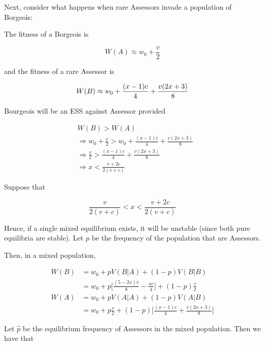 \documentclass{article}
\begin{document}
Next, consider what happens when rare Assessors invade a population of Borgeois:

The fitness of a Borgeois is

\begin{equation*}
    W(A) \approx w_0 + \frac{v}{2}
\end{equation*}

and the fitness of a rare Assessor is

\begin{equation*}
    W(B) \approx w_0 + \frac{(x - 1) c}{4} + \frac{v (2 x + 3)}{8} \\
\end{equation*}

Bourgeois will be an ESS against Assessor provided

\begin{align*}
    &W(B) > W(A) \\
    &\Rightarrow w_0 + \frac{v}{2} > w_0 + \frac{(x - 1) c}{4} + \frac{v (2 x + 3)}{8} \\
    &\Rightarrow \frac{v}{2} > \frac{(x - 1) c}{4} + \frac{v (2 x + 3)}{8} \\
    &\Rightarrow x < \frac{v + 2 c}{2(v + c)}
\end{align*}

Suppose that

\begin{equation*}
    \frac{v}{2(v + c)} < x < \frac{v + 2 c}{2(v + c)}
\end{equation*}

Hence, if a single mixed equilibrium exists, it will be unstable (since
both pure equilibria are stable). Let $p$ be the frequency of the
population that are Assessors.

Then, in a mixed population,

\begin{align*}
    W(B) &= w_0 + p V(B|A) + (1 - p) V(B|B) \\
         &= w_0 + p \Big[\frac{(5 - 2 x) v}{8} - \frac{x c}{4}\Big]
            + (1 - p) \frac{v}{2} \\
    W(A) &= w_0 + p V(A|A) + (1 - p) V(A|B) \\
         &= w_0 + p \frac{v}{2}
            + (1 - p) \Big[\frac{(x - 1) c}{4} + \frac{v (2 x + 3)}{8}\Big]
\end{align*}

Let $\hat{p}$ be the equilibrium frequency of Assessors in the mixed
population. Then we have that
\end{document}
